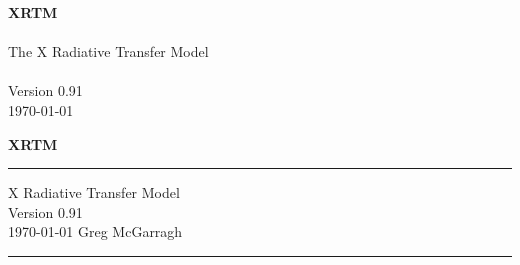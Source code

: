 %



\titleformat{\chapter}{\bf\LARGE}{\thechapter}{1em}{}


%
\newcommand\version{0.91}

\newcommand\createarg[1]{\xref{xrtm_create}{\sourcenamearg{#1}}}

\newcommand\interror[1]{#1 or \xref{XRTM_INT_ERROR}{XRTM\_\-INT\_\-ERROR} on error.}
\newcommand\dblerror[1]{#1 or \xref{XRTM_DBL_ERROR}{XRTM\_\-DBL\_\-ERROR} on error.}

\newcommand\interrornoret{\interror{Zero with successful completion}}
\newcommand\dblerrornoret{\dblerror{Zero with successful completion}}


%


%





\frontmatter


\iftth
\begin{center}
{\huge \bfseries XRTM} \\ \\
The X Radiative Transfer Model \\ \\
Version \version \\
\today
\end{center}
\else
\begin{titlepage}
\vspace*{1.25in}
{\noindent \huge \bfseries XRTM} \\
\rule{\linewidth}{3.0pt}
\flushright
X Radiative Transfer Model \\
Version \version \\
\usdate\today
\vfill
\flushleft
\Large Greg McGarragh
\rule{\linewidth}{1.5pt}
\end{titlepage}
\fi


